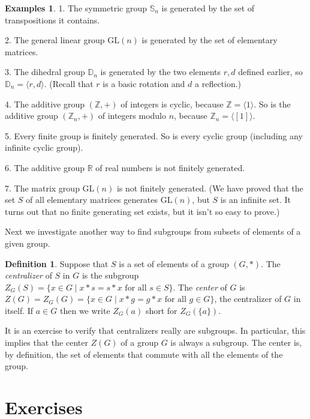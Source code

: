 \documentclass[11pt]{article}
\theoremstyle{definition}
\newtheorem{defn}[thm]{Definition}
\newtheorem{examples}[thm]{Examples}
\newcommand{\R}{\mathbb{R}} %
\newcommand{\Z}{\mathbb{Z}} %
\newcommand{\gen}[1]{\langle #1 \rangle}
\newcommand{\GL}{\mathrm{GL}}
\newcommand{\Sym}{\mathbb{S}}
\newcommand{\D}{\mathbb{D}}
\begin{document}
\begin{examples}
1. The symmetric group $\Sym_n$ is generated by the set of
transpositions it contains.  

2. The general linear group $\GL(n)$ is generated by the set of
elementary matrices.

3. The dihedral group $\D_n$ is generated by the two elements $r, d$
defined earlier, so $\D_n = \gen{r,d}$. (Recall that $r$ is a basic
rotation and $d$ a reflection.)

4. The additive group $(\Z,+)$ of integers is cyclic, because $\Z =
\gen{1}$. So is the additive group $(\Z_n,+)$ of integers modulo $n$,
because $\Z_n = \gen{[1]}$.

5. Every finite group is finitely generated. So is every cyclic group
(including any infinite cyclic group). 

6. The additive group $\R$ of real numbers is not finitely generated.

7. The matrix group $\GL(n)$ is not finitely generated. (We have
proved that the set $S$ of all elementary matrices generates $\GL(n)$,
but $S$ is an infinite set. It turns out that no finite generating set
exists, but it isn't so easy to prove.)
\end{examples}

Next we investigate another way to find subgroups from subsets of
elements of a given group.

\begin{defn}
  Suppose that $S$ is a set of elements of a group $(G,*)$. The
  \emph{centralizer} of $S$ in $G$ is the subgroup $Z_G(S) = \{ x \in
  G \mid x*s = s*x \text{ for all } s \in S \}$. The \emph{center} of
  $G$ is $Z(G) = Z_G(G) = \{ x \in G \mid x*g = g*x \text{ for all } g
  \in G \}$, the centralizer of $G$ in itself. If $a \in G$ then we
  write $Z_G(a)$ short for $Z_G(\{a\})$.
\end{defn}

It is an exercise to verify that centralizers really are subgroups. In
particular, this implies that the center $Z(G)$ of a group $G$ is
always a subgroup. The center is, by definition, the set of elements
that commute with all the elements of the group.

\section*{Exercises}
\end{document}
